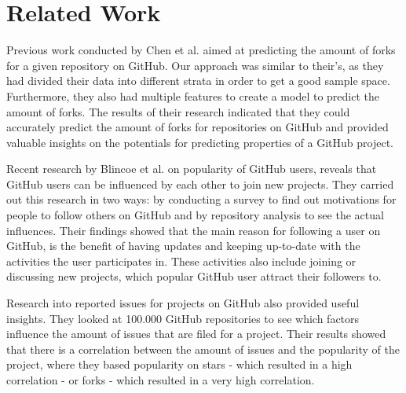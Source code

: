 \section{Related Work}
Previous work conducted by Chen et al. \cite{chen-2014} aimed at predicting the amount of forks for a given repository on GitHub.
Our approach was similar to their's, as they had divided their data into different strata in order to get a good sample space.
Furthermore, they also had multiple features to create a model to predict the amount of forks.
The results of their research indicated that they could accurately predict the amount of forks for repositories on GitHub and provided valuable insights on the potentials for predicting properties of a GitHub project.

Recent research by Blincoe et al. \cite{blincoe-2015} on popularity of GitHub users, reveals that GitHub users can be influenced by each other to join new projects.
They carried out this research in two ways: by conducting a survey to find out motivations for people to follow others on GitHub and by repository analysis to see the actual influences.
Their findings showed that the main reason for following a user on GitHub, is the benefit of having updates and keeping up-to-date with the activities the user participates in.
These activities also include joining or discussing new projects, which popular GitHub user attract their followers to.

Research \cite{bissyande-2013} into reported issues for projects on GitHub also provided useful insights.
They looked at 100.000 GitHub repositories to see which factors influence the amount of issues that are filed for a project.
Their results showed that there is a correlation between the amount of issues and the popularity of the project, where they based popularity on stars - which resulted in a high correlation - or forks - which resulted in a very high correlation.
